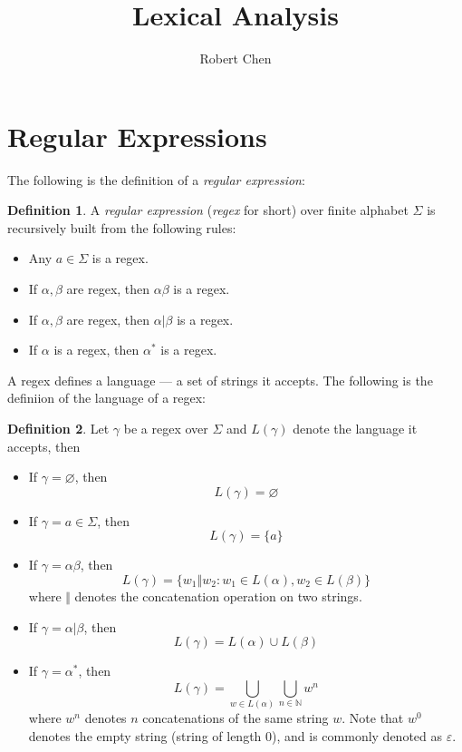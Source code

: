 \documentclass[titlepage]{article}
\title{Lexical Analysis}
\author{Robert Chen}
\theoremstyle{plain}
\theoremstyle{definition}
\newtheorem*{definition}{Definition}
\theoremstyle{remark}
\begin{document}
\maketitle

\newpage
\tableofcontents

\newpage
\section{Regular Expressions}
The following is the definition of a \textit{regular expression}:
\begin{definition}
  A \textit{regular expression} (\textit{regex} for short) over finite alphabet
  $\Sigma$ is recursively built from the following rules:
  \begin{itemize}
    \item Any $a\in\Sigma$ is a regex.
    \item If $\alpha,\beta$ are regex, then $\alpha\beta$ is a regex.
    \item If $\alpha,\beta$ are regex, then $\alpha|\beta$ is a regex.
    \item If $\alpha$ is a regex, then $\alpha^*$ is a regex.
  \end{itemize}
\end{definition}
A regex defines a language --- a set of strings it accepts. The
following is the definiion of the language of a regex:
\begin{definition}
  Let $\gamma$ be a regex over $\Sigma$ and $L(\gamma)$ denote the language it
  accepts, then
  \begin{itemize}
    \item If $\gamma=\varnothing$, then
      \[
        L(\gamma)=\varnothing
      \]
    \item If $\gamma=a\in\Sigma$, then
      \[
        L(\gamma)=\{a\}
      \]
    \item If $\gamma=\alpha\beta$, then
      \[
        L(\gamma)=\{w_1\mathbin\Vert w_2:w_1\in L(\alpha),w_2\in L(\beta)\}
      \]
      where $\Vert$ denotes the concatenation operation on two strings.
    \item If $\gamma=\alpha|\beta$, then
      \[
        L(\gamma)=L(\alpha)\cup L(\beta)
      \]
    \item If $\gamma=\alpha^*$, then
      \[
        L(\gamma)=\bigcup_{w\in L(\alpha)}\bigcup_{n\in\mathds{N}}w^n
      \]
      where $w^n$ denotes $n$ concatenations of the same string $w$. Note that
      $w^0$ denotes the empty string (string of length 0), and is commonly
      denoted as $\varepsilon$.
  \end{itemize}
\end{definition}
\end{document}
